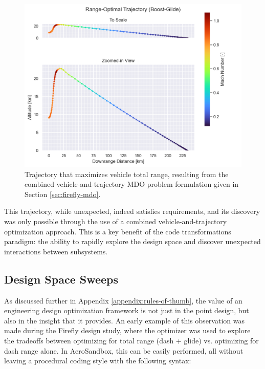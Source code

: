 \begin{figure}[h]
    \centering
    \includegraphics[width=\textwidth]{../figures/BAE-2022-06-17-Peter/ppt/media/image7.png}
    \caption{Trajectory that maximizes vehicle total range, resulting from the combined vehicle-and-trajectory MDO problem formulation given in Section \ref{sec:firefly-mdo}.}
    \label{fig:firefly_trajectory}
\end{figure}

This trajectory, while unexpected, indeed satisfies requirements, and its discovery was only possible through the use of a combined vehicle-and-trajectory optimization approach. This is a key benefit of the code transformations paradigm: the ability to rapidly explore the design space and discover unexpected interactions between subsystems.

\subsection{Design Space Sweeps}
\label{sec:firefly_sweeps}

As discussed further in Appendix \ref{appendix:rules-of-thumb}, the value of an engineering design optimization framework is not just in the point design, but also in the insight that it provides. An early example of this observation was made during the Firefly design study, where the optimizer was used to explore the tradeoffs between optimizing for total range (dash + glide) vs. optimizing for dash range alone. In AeroSandbox, this can be easily performed, all without leaving a procedural coding style with the following syntax:

